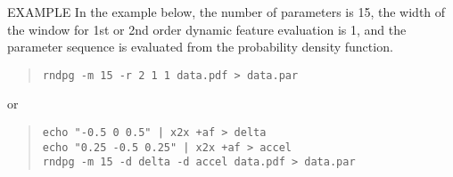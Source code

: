 \begin{qsection}{EXAMPLE}
	In the example below,
        the number of parameters is 15, the width of
        the window for 1st or 2nd order dynamic feature
        evaluation is 1, and the parameter sequence is
        evaluated from the probability density function.
 \begin{quote}
	\verb!rndpg -m 15 -r 2 1 1 data.pdf > data.par!
 \end{quote}
	or
 \begin{quote}
	\verb!echo "-0.5 0 0.5" | x2x +af > delta! \\
	\verb!echo "0.25 -0.5 0.25" | x2x +af > accel! \\
	\verb!rndpg -m 15 -d delta -d accel data.pdf > data.par!
 \end{quote}
\end{qsection}

